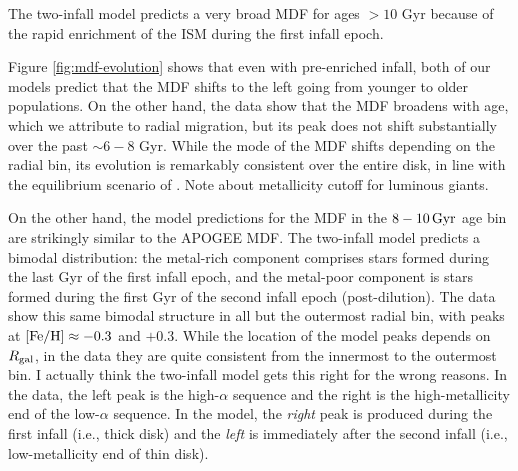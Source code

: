 \documentclass[twocolumn,twocolappendix,linenumbers]{aastex631}
\newcommand{\todo}[1]{{\color{red}#1}}
\newcommand{\mathFeH}{{\rm [Fe/H]}}
\begin{document}
The two-infall model predicts a very broad MDF for ages $>10$ Gyr because of the rapid enrichment of the ISM during the first infall epoch.

Figure \ref{fig:mdf-evolution} shows that even with pre-enriched infall, both of our models predict that the MDF shifts to the left going from younger to older populations. On the other hand, the data show that the MDF broadens with age, which we attribute to radial migration, but its peak does not shift substantially over the past $\sim6-8$ Gyr. While the mode of the MDF shifts depending on the radial bin, its evolution is remarkably consistent over the entire disk, in line with the equilibrium scenario of \citet{johnson_milky_2024}.
\todo{Note about metallicity cutoff for luminous giants.}

On the other hand, the model predictions for the MDF in the $8-10\,{\rm Gyr}$ age bin are strikingly similar to the APOGEE MDF. The two-infall model predicts a bimodal distribution: the metal-rich component comprises stars formed during the last Gyr of the first infall epoch, and the metal-poor component is stars formed during the first Gyr of the second infall epoch (post-dilution). The data show this same bimodal structure in all but the outermost radial bin, with peaks at $\mathFeH\approx-0.3$ and $+0.3$. While the location of the model peaks depends on $R_{\rm gal}$, in the data they are quite consistent from the innermost to the outermost bin. \todo{I actually think the two-infall model gets this right for the wrong reasons. In the data, the left peak is the high-$\alpha$ sequence and the right is the high-metallicity end of the low-$\alpha$ sequence. In the model, the {\it right} peak is produced during the first infall (i.e., thick disk) and the {\it left} is immediately after the second infall (i.e., low-metallicity end of thin disk).}
\end{document}

